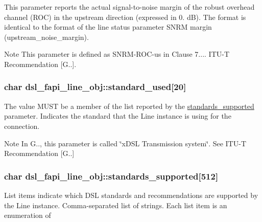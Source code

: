 This parameter reports the actual signal-\/to-\/noise margin of the robust overhead channel (R\-O\-C) in the upstream direction (expressed in 0. d\-B). The format is identical to the format of the line status parameter S\-N\-R\-M margin (upstream\-\_\-noise\-\_\-margin). \begin{DoxyNote}{Note}
This parameter is defined as S\-N\-R\-M-\/\-R\-O\-C-\/us in Clause 7.... I\-T\-U-\/\-T Recommendation \mbox{[}G..\mbox{]}. 
\end{DoxyNote}
\hypertarget{structdsl__fapi__line__obj_a264efe2323db92c69fe2b7d3213918c3}{
\subsubsection[{standard\-\_\-used}]{\setlength{\rightskip}{0pt plus 5cm}char dsl\-\_\-fapi\-\_\-line\-\_\-obj\-::standard\-\_\-used\mbox{[}20\mbox{]}}}\label{structdsl__fapi__line__obj_a264efe2323db92c69fe2b7d3213918c3}
The value M\-U\-S\-T be a member of the list reported by the \hyperlink{structdsl__fapi__line__obj_abc227e8ac4ba23bb87f65e9099dc0f65}{standards\-\_\-supported} parameter. Indicates the standard that the Line instance is using for the connection. \begin{DoxyNote}{Note}
In G.., this parameter is called \char`\"{}x\-D\-S\-L Transmission system\char`\"{}. See I\-T\-U-\/\-T Recommendation \mbox{[}G..\mbox{]} 
\end{DoxyNote}
\hypertarget{structdsl__fapi__line__obj_abc227e8ac4ba23bb87f65e9099dc0f65}{
\subsubsection[{standards\-\_\-supported}]{\setlength{\rightskip}{0pt plus 5cm}char dsl\-\_\-fapi\-\_\-line\-\_\-obj\-::standards\-\_\-supported\mbox{[}512\mbox{]}}}\label{structdsl__fapi__line__obj_abc227e8ac4ba23bb87f65e9099dc0f65}
List items indicate which D\-S\-L standards and recommendations are supported by the Line instance. Comma-\/separated list of strings. Each list item is an enumeration of
